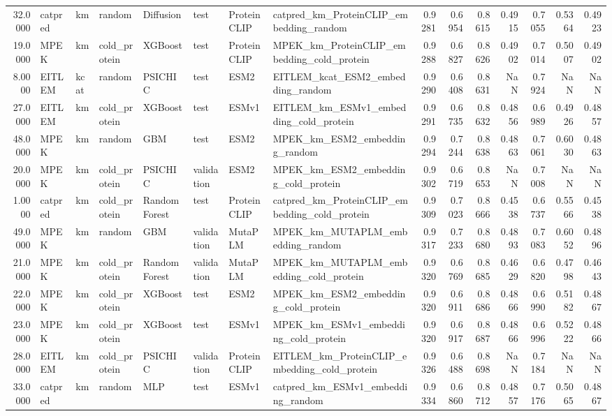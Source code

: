 \begin{tabular}{rlllllllrrrrrrr}
32.0000 & catpred & km & random & Diffusion & test & ProteinCLIP & catpred_km_ProteinCLIP_embedding_random & 0.9281 & 0.6954 & 0.8615 & 0.4915 & 0.7055 & 0.5364 & 0.4923 \\
19.0000 & MPEK & km & cold_protein & XGBoost & test & ProteinCLIP & MPEK_km_ProteinCLIP_embedding_cold_protein & 0.9288 & 0.6827 & 0.8626 & 0.4902 & 0.7014 & 0.5007 & 0.4902 \\
8.0000 & EITLEM & kcat & random & PSICHIC & test & ESM2 & EITLEM_kcat_ESM2_embedding_random & 0.9290 & 0.6408 & 0.8631 & NaN & 0.7924 & NaN & NaN \\
27.0000 & EITLEM & km & cold_protein & XGBoost & test & ESMv1 & EITLEM_km_ESMv1_embedding_cold_protein & 0.9291 & 0.6735 & 0.8632 & 0.4856 & 0.6989 & 0.4926 & 0.4857 \\
48.0000 & MPEK & km & random & GBM & test & ESM2 & MPEK_km_ESM2_embedding_random & 0.9294 & 0.7244 & 0.8638 & 0.4863 & 0.7061 & 0.6030 & 0.4863 \\
20.0000 & MPEK & km & cold_protein & PSICHIC & validation & ESM2 & MPEK_km_ESM2_embedding_cold_protein & 0.9302 & 0.6719 & 0.8653 & NaN & 0.7008 & NaN & NaN \\
1.0000 & catpred & km & cold_protein & Random Forest & test & ProteinCLIP & catpred_km_ProteinCLIP_embedding_cold_protein & 0.9309 & 0.7023 & 0.8666 & 0.4538 & 0.6737 & 0.5566 & 0.4538 \\
49.0000 & MPEK & km & random & GBM & validation & MutaPLM & MPEK_km_MUTAPLM_embedding_random & 0.9317 & 0.7233 & 0.8680 & 0.4893 & 0.7083 & 0.6052 & 0.4896 \\
21.0000 & MPEK & km & cold_protein & Random Forest & validation & MutaPLM & MPEK_km_MUTAPLM_embedding_cold_protein & 0.9320 & 0.6769 & 0.8685 & 0.4629 & 0.6820 & 0.4798 & 0.4643 \\
22.0000 & MPEK & km & cold_protein & XGBoost & test & ESM2 & MPEK_km_ESM2_embedding_cold_protein & 0.9320 & 0.6911 & 0.8686 & 0.4866 & 0.6990 & 0.5182 & 0.4867 \\
23.0000 & MPEK & km & cold_protein & XGBoost & test & ESMv1 & MPEK_km_ESMv1_embedding_cold_protein & 0.9320 & 0.6917 & 0.8687 & 0.4866 & 0.6996 & 0.5222 & 0.4866 \\
28.0000 & EITLEM & km & cold_protein & PSICHIC & validation & ProteinCLIP & EITLEM_km_ProteinCLIP_embedding_cold_protein & 0.9326 & 0.6488 & 0.8698 & NaN & 0.7184 & NaN & NaN \\
33.0000 & catpred & km & random & MLP & test & ESMv1 & catpred_km_ESMv1_embedding_random & 0.9334 & 0.6860 & 0.8712 & 0.4857 & 0.7176 & 0.5065 & 0.4867 \\

\end{tabular}
